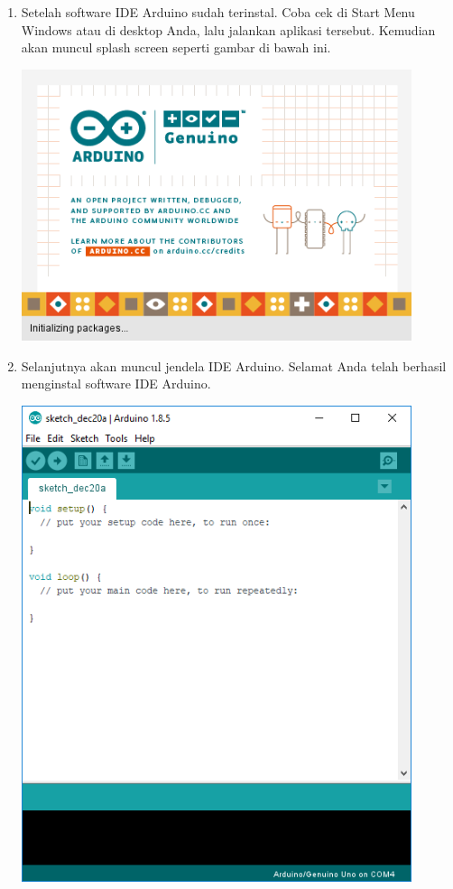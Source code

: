 \begin{enumerate}
\item Setelah software IDE Arduino sudah terinstal. Coba cek di Start Menu Windows atau di desktop Anda, lalu jalankan aplikasi tersebut. Kemudian akan muncul splash screen seperti gambar di bawah ini.
\break
\centerline{\includegraphics[width=0.9\textwidth]{figures/aride11.png}}
\item Selanjutnya akan muncul jendela IDE Arduino. Selamat Anda telah berhasil menginstal software IDE Arduino.
\break
\centerline{\includegraphics[width=0.9\textwidth]{figures/aride12.png}}
\end{enumerate}


